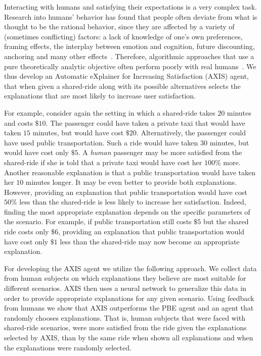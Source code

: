 \documentclass[letterpaper]{article} %
\begin{document}
Interacting with humans and satisfying their expectations is a very complex task. Research into humans' behavior has found that people often deviate from what is thought to be the rational behavior, since they are affected by a variety of (sometimes conflicting) factors: a lack of knowledge of one's own preferences, framing effects, the interplay between emotion and cognition, future discounting, anchoring and many other effects~\cite{tversky81,Loewenstein00,ArielyAnchor,camerer03}.
Therefore, algorithmic approaches that use a pure theoretically analytic objective often perform poorly with real humans~\cite{Peledetal11,azaria2015strategic,nay2016predicting}.
We thus develop an Automatic eXplainer for Increasing Satisfaction (AXIS) agent, that when given a shared-ride along with its possible alternatives selects the explanations that are most likely to increase user satisfaction.

For example, consider again the setting in which a shared-ride takes $20$ minutes and costs $\$10$.
The passenger could have taken a private taxi that would have taken $15$ minutes, but would have cost $\$20$. Alternatively, the passenger could have used public transportation. Such a ride would have taken $30$ minutes, but would have cost only $\$5$.
A \emph{human} passenger may be more satisfied from the shared-ride if she is told that a private taxi would have cost her $100\%$ more. Another reasonable explanation is that a public transportation would have taken her $10$ minutes longer. It may be even better to provide both explanations. However, providing an explanation that public transportation would have cost $50\%$ less than the shared-ride is less likely to increase her satisfaction. Indeed, finding the most appropriate explanation depends on the specific parameters of the scenario. For example, if public transportation still costs $\$5$ but the shared ride costs only $\$6$, providing an explanation that public transportation would have cost only $\$1$ less than the shared-ride may now become an appropriate explanation.

For developing the AXIS agent we utilize the following approach.
We collect data from human subjects on which explanations they believe are most suitable for different scenarios. AXIS then uses a neural network to generalize this data in order to provide appropriate explanations for any given scenario. Using feedback from humans we show that AXIS outperforms the PBE agent and an agent that randomly chooses explanations. That is, human subjects that were faced with shared-ride scenarios, were more satisfied from the ride given the explanations selected by AXIS, than by the same ride when shown all explanations and when the explanations were randomly selected.
\end{document}
